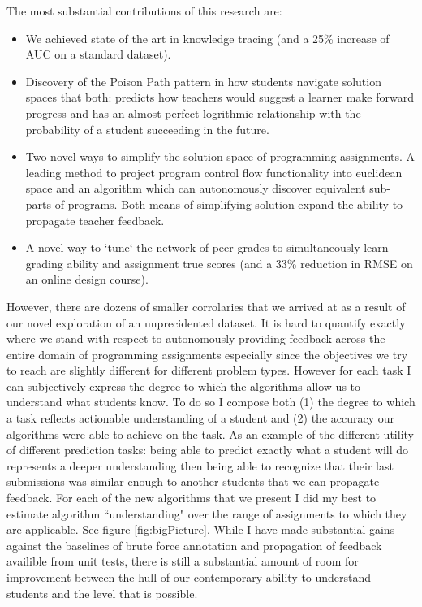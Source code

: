 The most substantial contributions of this research are:
\begin{itemize}
\item We achieved state of the art in knowledge tracing (and a 25\% increase of AUC on a standard dataset). 

\item Discovery of the Poison Path pattern in how students navigate solution spaces that both: predicts how teachers would suggest a learner make forward progress and has an almost perfect logrithmic relationship with the probability of a student succeeding in the future.

\item Two novel ways to simplify the solution space of programming assignments. A leading method to project program control flow functionality into euclidean space and an algorithm which can autonomously discover equivalent sub-parts of programs. Both means of simplifying solution expand the ability to propagate teacher feedback.

\item A novel way to `tune` the network of peer grades to simultaneously learn grading ability and assignment true scores (and a 33\% reduction in RMSE on an online design course).

\end{itemize}
However, there are dozens of smaller corrolaries that we arrived at as a result of our novel exploration of an unprecidented dataset. It is hard to quantify exactly where we stand with respect to autonomously providing feedback across the entire domain of programming assignments especially since the objectives we try to reach are slightly different for different problem types. However for each task I can subjectively express the degree to which the algorithms allow us to understand what students know. To do so I compose both (1) the degree to which a task reflects actionable understanding of a student and (2) the accuracy our algorithms were able to achieve on the task. As an example of the different utility of different prediction tasks: being able to predict exactly what a student will do represents a deeper understanding then being able to recognize that their last submissions was similar enough to another students that we can propagate feedback. For each of the new algorithms that we present I did my best to estimate algorithm ``understanding" over the range of assignments to which they are applicable. See figure \ref{fig:bigPicture}. While I have made substantial gains against the baselines of brute force annotation and propagation of feedback availible from unit tests, there is still a substantial amount of room for improvement between the hull of our contemporary ability to understand students and the level that is possible.


